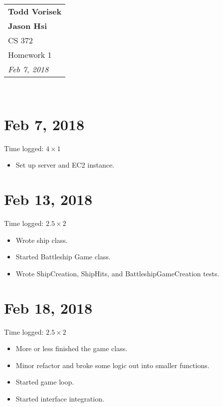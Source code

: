 \documentclass{article}
\begin{document}
  \null\hfill
  \begin{tabular}[t]{l@{}}
    \textbf{Todd Vorisek}\\
    \textbf{Jason Hsi} \\
    CS 372 \\
    Homework 1\\
    \textit{Feb 7, 2018} \\
  \end{tabular}\\

  \section*{Feb 7, 2018}
    Time logged: $4 \times 1 $
    \begin{itemize}
      \item Set up server and EC2 instance.
    \end{itemize}

  \section*{Feb 13, 2018}
    Time logged: $2.5 \times 2 $
    \begin{itemize}
      \item Wrote ship class. 
      \item Started Battleship Game class. 
      \item Wrote ShipCreation, ShipHits, and BattleshipGameCreation tests.
    \end{itemize}

  \section*{Feb 18, 2018}
    Time logged: $2.5 \times 2 $
    \begin{itemize}
      \item More or less finished the game class.
      \item Minor refactor and broke some logic out into smaller functions.
      \item Started game loop.
      \item Started interface integration.
    \end{itemize}
\end{document}
